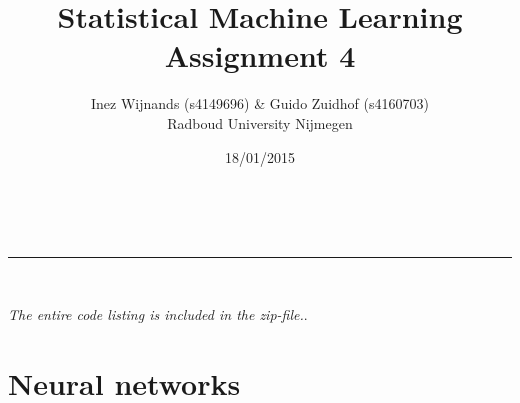 \documentclass[a4paper,10pt]{article}
\makeatletter
\numberwithin{equation}{section} %
\numberwithin{figure}{section} %
\numberwithin{table}{section} %
\newcommand{\linia}{\rule{\linewidth}{0.5pt}}
\theoremstyle{mytheor}
\renewcommand{\maketitle}{
\begin{center}
\vspace{2ex}
{\huge \textsc{\@title}}
\vspace{1ex}
\\
\linia\\
\@author  \@date
\vspace{4ex}
\end{center}
}
\makeatother
\begin{document}
\title{Statistical Machine Learning \\ Assignment 4}

\author{Inez Wijnands (s4149696) \& Guido Zuidhof (s4160703)\\ Radboud University Nijmegen\\}

\date{18/01/2015}

\maketitle

\noindent \textit{The entire code listing is included in the zip-file.}.\vspace{-0.5cm}
\section{Neural networks}
\end{document}

